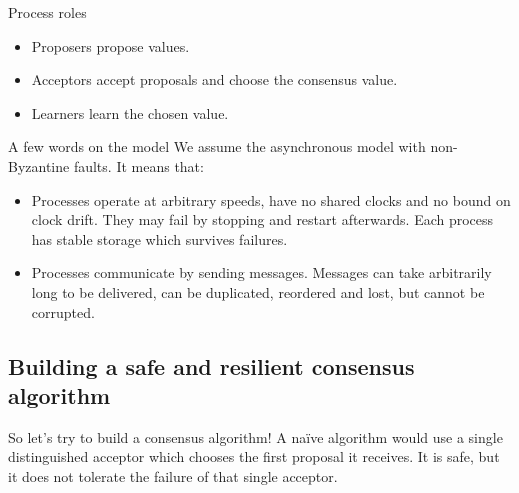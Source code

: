 \documentclass{beamer}
\begin{document}
\begin{frame}{Process roles}
  \begin{itemize}
    \item Proposers propose values.
    \item Acceptors accept proposals and choose the consensus value.
    \item Learners learn the chosen value.
  \end{itemize}
\end{frame}

\begin{frame}{A few words on the model}
  We assume the \alert{asynchronous} model with \alert{non-Byzantine} faults. It means that:
  \begin{itemize}
    \item Processes operate at arbitrary speeds, have no shared clocks and no bound on clock drift. They may fail by stopping and restart afterwards. Each process has stable storage which survives failures.
    \item Processes communicate by sending messages. Messages can take arbitrarily long to be delivered, can be duplicated, reordered and lost, but \alert{cannot be corrupted}.
  \end{itemize}
\end{frame}

\subsection{Building a safe and resilient consensus algorithm}
\begin{frame}{So let's try to build a consensus algorithm!}
  A na\"ive algorithm would use a single distinguished acceptor which chooses the first proposal it receives. It is safe, but it does not tolerate the failure of that single acceptor.
  \begin{figure}[!h]
  \centering
  \end{figure}
\end{frame}
\end{document}
